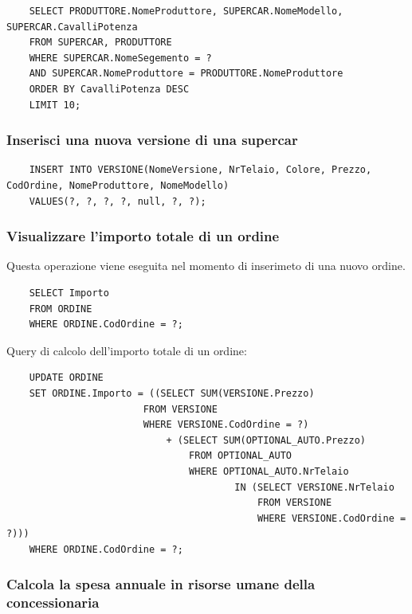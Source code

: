 \documentclass[11pt]{article}
\begin{document}
\begin{lstlisting}
    SELECT PRODUTTORE.NomeProduttore, SUPERCAR.NomeModello, SUPERCAR.CavalliPotenza
    FROM SUPERCAR, PRODUTTORE
    WHERE SUPERCAR.NomeSegemento = ?
    AND SUPERCAR.NomeProduttore = PRODUTTORE.NomeProduttore
    ORDER BY CavalliPotenza DESC
    LIMIT 10;
\end{lstlisting}

\subsubsection*{Inserisci una nuova versione di una supercar}

\begin{lstlisting}
    INSERT INTO VERSIONE(NomeVersione, NrTelaio, Colore, Prezzo, CodOrdine, NomeProduttore, NomeModello)
    VALUES(?, ?, ?, ?, null, ?, ?);
\end{lstlisting}

\subsubsection*{Visualizzare l’importo totale di un ordine}

Questa operazione viene eseguita nel momento di inserimeto di una nuovo ordine.

\begin{lstlisting}
    SELECT Importo
    FROM ORDINE
    WHERE ORDINE.CodOrdine = ?;
\end{lstlisting}

Query di calcolo dell'importo totale di un ordine:

\begin{lstlisting}
    UPDATE ORDINE
    SET ORDINE.Importo = ((SELECT SUM(VERSIONE.Prezzo)
                        FROM VERSIONE 
                        WHERE VERSIONE.CodOrdine = ?) 
                            + (SELECT SUM(OPTIONAL_AUTO.Prezzo)
                                FROM OPTIONAL_AUTO
                                WHERE OPTIONAL_AUTO.NrTelaio 
                                        IN (SELECT VERSIONE.NrTelaio
                                            FROM VERSIONE
                                            WHERE VERSIONE.CodOrdine = ?)))
    WHERE ORDINE.CodOrdine = ?;
\end{lstlisting}

\subsubsection*{Calcola la spesa annuale in risorse umane della concessionaria}
\end{document}
